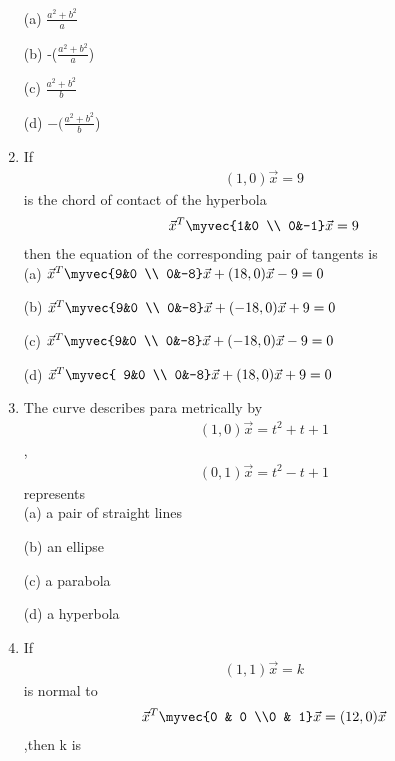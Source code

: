 \begin{enumerate}
    \choice (a) $\frac{a^2+b^2}{a}$
    
     \choice (b) -($\frac{a^2+b^2}{a}$)
    
    \choice (c) $\frac{a^2+b^2}{b}$
    
    \choice (d) $-(\frac{a^2+b^2}{b}$)\\
    
    \item If \begin{align}(1,0)\vec x=9\end{align} is the chord of contact of the hyperbola \begin{align}\vec x^T \myvec {1&0 \\ 0&-1}\vec x=9\end{align} then the equation of the corresponding pair of tangents is\\
    
    \choice (a) $\vec x^T \myvec{9&0 \\ 0&-8}\vec x+(18,0)\vec x-9=0$
    
    \choice (b) $\vec x^T \myvec {9&0 \\ 0&-8}\vec x+(-18,0)\vec x+9=0$

    \choice (c) $\vec x^T \myvec{9&0 \\ 0&-8}\vec x+(-18,0)\vec x-9=0$

   \choice (d) $\vec x^T \myvec{ 9&0 \\ 0&-8}\vec x+(18,0)\vec x+9=0$\\

\item The curve describes para metrically by \begin{align}(1,0)\vec x=t^2+t+1\end{align},\begin{align}(0,1)\vec x=t^2-t+1\end{align} represents\\

\choice (a) a pair of straight lines 

\choice (b) an ellipse

\choice (c) a parabola

\choice (d) a hyperbola\\

\item If \begin{align}(1,1)\vec x=k\end{align} is normal to \begin{align}\vec x^T\myvec{0 & 0 \\0 & 1} \vec x=(12,0)\vec x \end{align},then k is \\
    

\end{enumerate}

